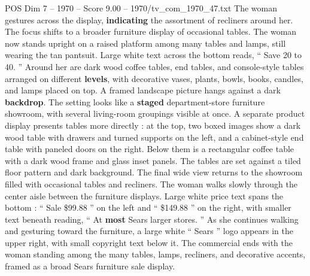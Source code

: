 \begin{textsample}{POS Dim 7 – 1970 – Score 9.00 – 1970/tv\_com\_1970\_47.txt}
The woman gestures across the display, \textbf{indicating} the assortment of recliners around her.
The focus shifts to a broader furniture display of occasional tables.
The woman now stands upright on a raised platform among many tables and lamps, still wearing the tan pantsuit.
Large white text across the bottom reads, “ Save 20 to 40. ” Around her are dark wood coffee tables, end tables, and console-style tables arranged on different \textbf{levels}, with decorative vases, plants, bowls, books, candles, and lamps placed on top.
A framed landscape picture hangs against a dark \textbf{backdrop}.
The setting looks like a \textbf{staged} department-store furniture showroom, with several living-room groupings visible at once.
A separate product display presents tables more directly : at the top, two boxed images show a dark wood table with drawers and turned supports on the left, and a cabinet-style end table with paneled doors on the right.
Below them is a rectangular coffee table with a dark wood frame and glass inset panels.
The tables are set against a tiled floor pattern and dark background.
The final wide view returns to the showroom filled with occasional tables and recliners.
The woman walks slowly through the center aisle between the furniture displays.
Large white price text spans the bottom : “ Sale \$99.88 ” on the left and “ \$149.88 ” on the right, with smaller text beneath reading, “ At \textbf{most} Sears larger stores. ” As she continues walking and gesturing toward the furniture, a large white “ Sears ” logo appears in the upper right, with small copyright text below it.
The commercial ends with the woman standing among the many tables, lamps, recliners, and decorative accents, framed as a broad Sears furniture sale display.

\end{textsample}
